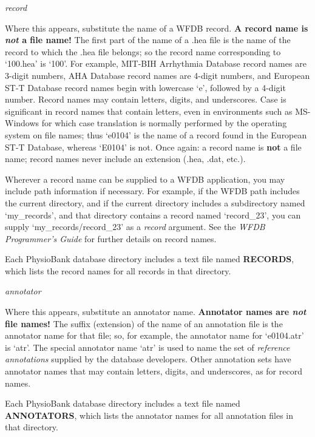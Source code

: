 \documentclass[twoside]{book}
\begin{document}
\begin{description}
\item{\textit{record}}

Where this appears, substitute the name of a WFDB record.  \textbf{A record
name is \textit{not} a file name!} The first part of the name of a .hea
file is the name of the record to which the .hea file belongs; so the
record name corresponding to `100.hea' is `100'.  For example, MIT-BIH
Arrhythmia Database record names are 3-digit numbers, AHA Database
record names are 4-digit numbers, and European ST-T Database record
names begin with lowercase `e', followed by a 4-digit number.  Record
names may contain letters, digits, and underscores.  Case is significant in
record names that contain letters, even in environments such as
MS-Windows for which case translation is normally performed by the
operating system on file names; thus `e0104' is the name of a record
found in the European ST-T Database, whereas `E0104' is not.  Once
again: a record name is \textbf{not} a file name; record names never
include an extension (.hea, .dat, etc.).

Wherever a record name can be supplied to a WFDB application, you may include
path information if necessary.  For example, if the WFDB path includes the
current directory, and if the current directory includes a subdirectory named
`my\_records', and that directory contains a record named `record\_23', you can
supply `my\_records/record\_23' as a \textit{record} argument.  See the
\textit{WFDB Programmer's Guide} for further details on record names.

Each PhysioBank database directory includes a text file named \textbf{RECORDS},
which lists the record names for all records in that directory.

\item{\textit{annotator}}

Where this appears, substitute an annotator name.  \textbf{Annotator names are
\textit{not} file names!} The suffix (extension) of the name of an
annotation file is the annotator name for that file; so, for example, the
annotator name for `e0104.atr' is `atr'.  The special annotator name `atr' is
used to name the set of \textit{reference annotations} supplied by the database
developers.  Other annotation sets have annotator names that may contain
letters, digits, and underscores, as for record names.

Each PhysioBank database directory includes a text file named
\textbf{ANNOTATORS}, which lists the annotator names for all annotation files
in that directory.


\end{description}
\end{document}
